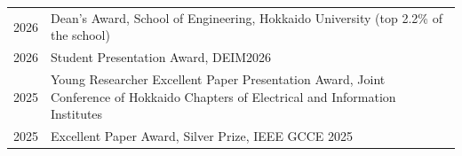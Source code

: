 
\begin{longtable}[l]{@{}p{} p{}}

    2026 & Dean's Award, School of Engineering, Hokkaido University (top 2.2\% of the school) \\

    2026 & Student Presentation Award, DEIM2026 \\

    2025 & Young Researcher Excellent Paper Presentation Award, Joint Conference of Hokkaido Chapters of Electrical and Information Institutes \\

    2025 & Excellent Paper Award, Silver Prize, IEEE GCCE 2025 \\

\end{longtable}
